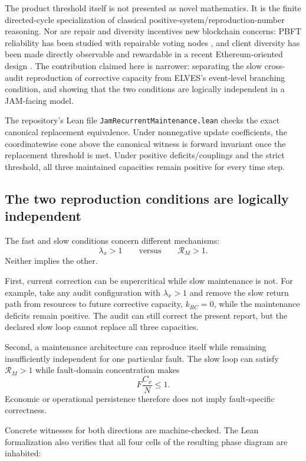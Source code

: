 The product threshold itself is not presented as novel mathematics.  It is the finite directed-cycle specialization of classical positive-system/reproduction-number reasoning.  Nor are repair and diversity incentives new blockchain concerns: PBFT reliability has been studied with repairable voting nodes \citep{chang2023repairable}, and client diversity has been made directly observable and rewardable in a recent Ethereum-oriented design \citep{ron2025diversity}.  The contribution claimed here is narrower: separating the slow cross-audit reproduction of corrective capacity from ELVES's event-level branching condition, and showing that the two conditions are logically independent in a JAM-facing model.

The repository's Lean file \texttt{JamRecurrentMaintenance.lean} checks the exact canonical replacement equivalence.  Under nonnegative update coefficients, the coordinatewise cone above the canonical witness is forward invariant once the replacement threshold is met.  Under positive deficits/couplings and the strict threshold, all three maintained capacities remain positive for every time step.

\subsection{The two reproduction conditions are logically independent}

The fast and slow conditions concern different mechanisms:
\[
\boxed{\lambda_x>1}
\qquad\text{versus}\qquad
\boxed{\mathcal R_M>1}.
\]
Neither implies the other.

First, current correction can be supercritical while slow maintenance is not.  For example, take any audit configuration with \(\lambda_x>1\) and remove the slow return path from resources to future corrective capacity, \(k_{RC}=0\), while the maintenance deficits remain positive.  The audit can still correct the present report, but the declared slow loop cannot replace all three capacities.

Second, a maintenance architecture can reproduce itself while remaining insufficiently independent for one particular fault.  The slow loop can satisfy \(\mathcal R_M>1\) while fault-domain concentration makes
\[
F\frac{C_x}{N}\le1.
\]
Economic or operational persistence therefore does not imply fault-specific correctness.

Concrete witnesses for both directions are machine-checked.  The Lean formalization also verifies that all four cells of the resulting phase diagram are inhabited:

